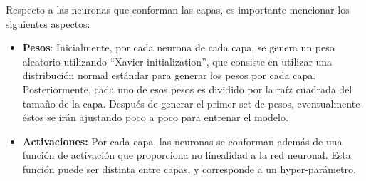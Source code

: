 \documentclass[journal]{IEEEtran}
\begin{document}
Respecto a las neuronas que conforman las capas, es importante mencionar los siguientes aspectos:
\begin{itemize}
    \item \textbf{Pesos}: Inicialmente, por cada neurona de cada capa, se genera un peso aleatorio utilizando ``Xavier initialization'', que consiste en utilizar una distribución normal estándar para generar los pesos por cada capa. Posteriormente, cada uno de esos pesos es dividido por la raíz cuadrada del tamaño de la capa. Después de generar el primer set de pesos, eventualmente éstos se irán ajustando poco a poco para entrenar el modelo. 
    \item \textbf{Activaciones:} Por cada capa, las neuronas se conforman además de una función de activación que proporciona no linealidad a la red neuronal. Esta función puede ser distinta entre capas, y corresponde a un hyper-parámetro. 
\end{itemize}
\end{document}
